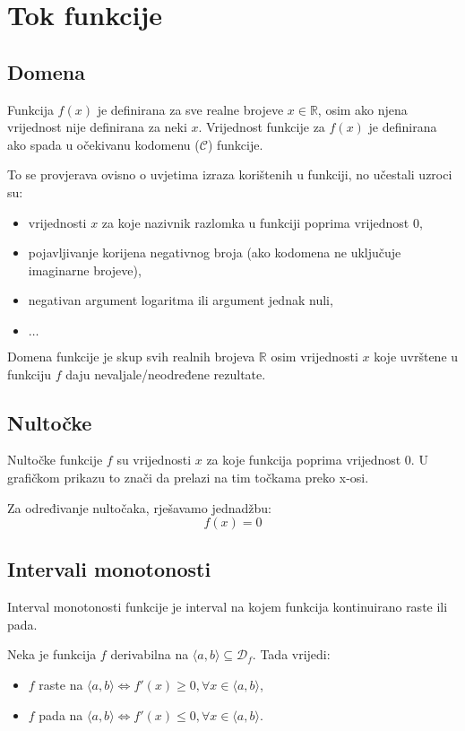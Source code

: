 \section{Tok funkcije}

\subsection{Domena}

Funkcija $f(x)$ je definirana za sve realne brojeve $x\in\mathbb{R}$, osim ako
njena vrijednost nije definirana za neki $x$. Vrijednost funkcije za $f(x)$ je
definirana ako spada u očekivanu kodomenu ($\mathcal{C}$) funkcije.

To se provjerava ovisno o uvjetima izraza korištenih u funkciji, no učestali
uzroci su:
\begin{itemize}
    \item vrijednosti $x$ za koje nazivnik razlomka u funkciji poprima vrijednost $0$,
    \item pojavljivanje korijena negativnog broja (ako kodomena ne uključuje imaginarne brojeve),
    \item negativan argument logaritma ili argument jednak nuli,
    \item $\dots$
\end{itemize}

\noindent
Domena funkcije je skup svih realnih brojeva $\mathbb{R}$ osim vrijednosti $x$
koje uvrštene u funkciju $f$ daju nevaljale/neodređene rezultate.

\subsection{Nultočke}

Nultočke funkcije $f$ su vrijednosti $x$ za koje funkcija poprima vrijednost $0$.
U grafičkom prikazu to znači da prelazi na tim točkama preko x-osi.

Za određivanje nultočaka, rješavamo jednadžbu:
$$
f(x) = 0
$$

\subsection{Intervali monotonosti}

Interval monotonosti funkcije je interval na kojem funkcija kontinuirano raste
ili pada.

\begin{theorembox}
    Neka je funkcija $f$ derivabilna na $\langle a,b \rangle \subseteq \mathcal{D}_f$.
    Tada vrijedi:
    \begin{itemize}
        \item $f$ raste na $\langle a,b \rangle \Leftrightarrow f'(x) \geq 0, \forall x \in \langle a,b \rangle$,
        \item $f$ pada na $\langle a,b \rangle \Leftrightarrow f'(x) \leq 0, \forall x \in \langle a,b \rangle$.
    \end{itemize}
\end{theorembox}

